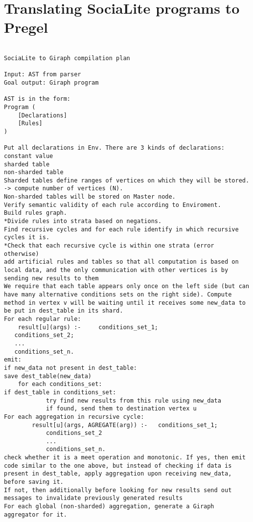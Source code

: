 
\chapter{Translating SociaLite programs to Pregel}\label{r:s2p}


\begin{verbatim}

SociaLite to Giraph compilation plan

Input: AST from parser
Goal output: Giraph program

AST is in the form:
Program (
	[Declarations]
	[Rules]
)

Put all declarations in Env. There are 3 kinds of declarations:
constant value
sharded table
non-sharded table
Sharded tables define ranges of vertices on which they will be stored. -> compute number of vertices (N).
Non-sharded tables will be stored on Master node.
Verify semantic validity of each rule according to Enviroment.
Build rules graph.
*Divide rules into strata based on negations.
Find recursive cycles and for each rule identify in which recursive cycles it is.
*Check that each recursive cycle is within one strata (error otherwise)
add artificial rules and tables so that all computation is based on local data, and the only communication with other vertices is by sending new results to them
We require that each table appears only once on the left side (but can have many alternative conditions sets on the right side). Compute method in vertex v will be waiting until it receives some new_data to be put in dest_table in its shard.
For each regular rule:
	result[u](args) :- 	   conditions_set_1;
   conditions_set_2;
   ...
   conditions_set_n.
emit:
if new_data not present in dest_table:
save dest_table(new_data)
	for each conditions_set:
if dest_table in conditions_set:
			try find new results from this rule using new_data
			if found, send them to destination vertex u
For each aggregation in recursive cycle:
		result[u](args, AGREGATE(arg)) :- 	conditions_set_1;
   			conditions_set_2
   			...
   			conditions_set_n.
check whether it is a meet operation and monotonic. If yes, then emit code similar to the one above, but instead of checking if data is present in dest_table, apply aggregation upon receiving new_data, before saving it.
If not, then additionally before looking for new results send out messages to invalidate previously generated results
For each global (non-sharded) aggregation, generate a Giraph aggregator for it.



\end{verbatim}





